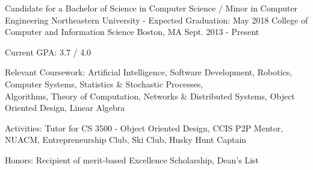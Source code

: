 


\begin{cventries}

  \cventry
    {Candidate for a Bachelor of Science in Computer Science / Minor in Computer Engineering} %
    {Northeastern University - Expected Graduation: May 2018 \newline College of Computer and Information Science} %
    {Boston, MA} %
    {Sept. 2013 - Present} %
    {
      \begin{cvitems} %
        \item {Current GPA: 3.7 / 4.0}
        \item {Relevant Coursework: Artificial Intelligence, Software Development, Robotics, Computer Systems, Statistics \& Stochastic Processes,\\
            \hspace*{3.11cm} Algorithms, Theory of Computation, Networks \& Distributed Systems, Object Oriented Design, Linear Algebra}
        \item {Activities: Tutor for CS 3500 - Object Oriented Design, CCIS P2P Mentor, NUACM, Entrepreneurship Club, Ski Club, Husky Hunt Captain}
        \item {Honors: Recipient of merit-based Excellence Scholarship, Dean's List}
      \end{cvitems}
    }

\end{cventries}

